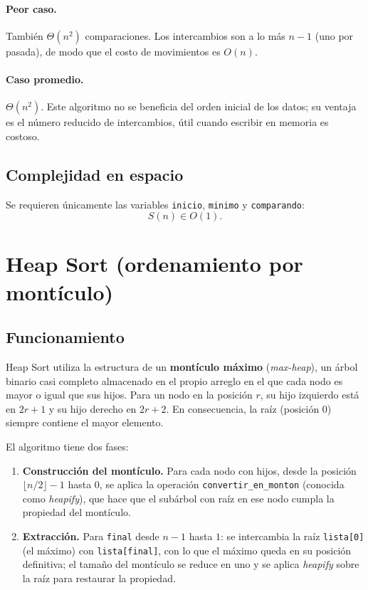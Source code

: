 \paragraph{Peor caso.} También $\Theta(n^2)$ comparaciones. Los intercambios son a lo más $n-1$ (uno por pasada), de modo que el costo de movimientos es $O(n)$.

\paragraph{Caso promedio.} $\Theta(n^2)$. Este algoritmo no se beneficia del orden inicial de los datos; su ventaja es el número reducido de intercambios, útil cuando escribir en memoria es costoso.

\subsection{Complejidad en espacio}

Se requieren únicamente las variables \texttt{inicio}, \texttt{minimo} y \texttt{comparando}:
\[
  S(n) \in O(1).
\]

\section{Heap Sort (ordenamiento por montículo)}

\subsection{Funcionamiento}

Heap Sort utiliza la estructura de un \textbf{montículo máximo} (\emph{max-heap}), un árbol binario casi completo almacenado en el propio arreglo en el que cada nodo es mayor o igual que sus hijos. Para un nodo en la posición $r$, su hijo izquierdo está en $2r+1$ y su hijo derecho en $2r+2$. En consecuencia, la raíz (posición $0$) siempre contiene el mayor elemento.

El algoritmo tiene dos fases:

\begin{enumerate}
  \item \textbf{Construcción del montículo.} Para cada nodo con hijos, desde la posición $\lfloor n/2 \rfloor - 1$ hasta $0$, se aplica la operación \texttt{convertir\_en\_monton} (conocida como \emph{heapify}), que hace que el subárbol con raíz en ese nodo cumpla la propiedad del montículo.
  \item \textbf{Extracción.} Para \texttt{final} desde $n-1$ hasta $1$: se intercambia la raíz \texttt{lista[0]} (el máximo) con \texttt{lista[final]}, con lo que el máximo queda en su posición definitiva; el tamaño del montículo se reduce en uno y se aplica \emph{heapify} sobre la raíz para restaurar la propiedad.
\end{enumerate}

